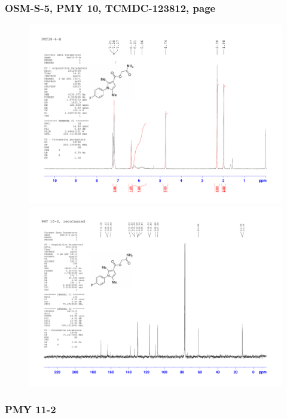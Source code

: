 \documentclass[12pt, a4paper,titlepage]{article}
\begin{document}
{\subsubsection*{OSM-S-5, PMY 10, TCMDC-123812, page \pageref{exp:PMY10}}
\label{spec:PMY10}
	\begin{figure}[H] 
	\begin{center}
	\includegraphics[width=14.5cm]{expdata/PMY10/1H}
	\includegraphics[width=14.5cm]{expdata/PMY10/13C}
	\end{center}
	\end{figure}

\subsubsection*{PMY 11-2}

}
\end{document}
